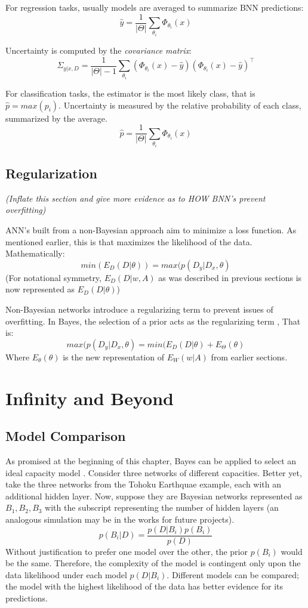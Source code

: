 For regression tasks, usually models are averaged to summarize BNN predictions: 
$$
\hat{y} = \frac{1}{|\Theta|} \sum_{\theta_i} \Phi_{\theta_i}(x)
$$

Uncertainty is computed by the \textit{covariance matrix}:
$$
\Sigma_{y|x,D} = \frac{1}{|\Theta|-1} \sum_{\theta_i} (\Phi_{\theta_i}(x) - \hat{y}) (\Phi_{\theta_i}(x) - \hat{y})^\intercal
$$

For classification tasks, the estimator is the most likely class, that is $\hat{p} = max(p_i)$.  Uncertainty is measured by the relative probability of each class, summarized by the average.
$$
\hat{p} = \frac{1}{|\Theta|} \sum_{\theta_i} \Phi_{\theta_i}(x)
$$

\subsection{Regularization}

\textit{(Inflate this section and give more evidence as to HOW BNN's prevent overfitting)}

ANN's built from a non-Bayesian approach aim to minimize a loss function.  As mentioned earlier, this is that maximizes the likelihood of the data.  Mathematically:
$$
min(E_D(D|\theta)) = max(p(D_y|D_x,\theta)
$$
(For notational symmetry, $E_D(D|w,A)$ as was described in previous sections is now represented as $E_D(D|\theta)$)

Non-Bayesian networks introduce a regularizing term to prevent issues of overfitting.  In Bayes, the selection of a prior acts as the regularizing term \cite{Jospin},  That is:
$$
 max(p(D_y|D_x,\theta) = min(E_D(D|\theta) + E_{\Theta}(\theta)
$$
Where $E_{\theta}(\theta)$ is the new representation of $E_W(w|A)$ from earlier sections.

\section{Infinity and Beyond}

\subsection{Model Comparison}
As promised at the beginning of this chapter, Bayes can be applied to select an ideal capacity model \cite{bishop1997bayesian}.  Consider three networks of different capacities.  Better yet, take the three networks from the Tohoku Earthquae example, each with an additional hidden layer.  Now, suppose they are Bayesian networks represented as $B_1, B_2, B_3$ with the subscript representing the number of hidden layers (an analogous simulation may be in the works for future projects).
$$
p(B_i|D) = \frac{p(D|B_i)p(B_i)}{p(D)}
$$
Without justification to prefer one model over the other, the prior $p(B_i)$ would be the same.  Therefore, the complexity of the model is contingent only upon the data likelihood under each model $p(D|B_i)$.  Different models can be compared; the model with the highest likelihood of the data has better evidence for its predictions.

